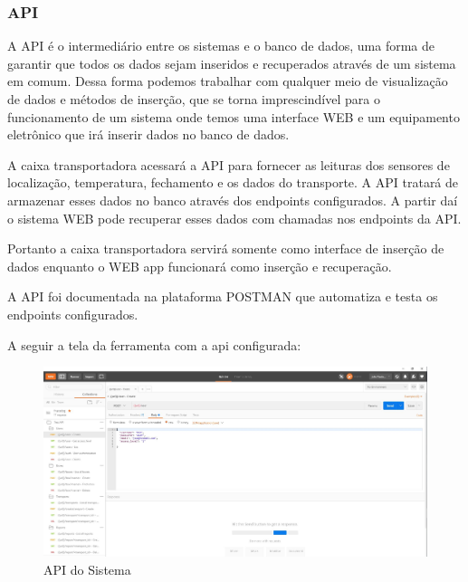 \subsubsection{API}

A API é o intermediário entre os sistemas e o banco de dados, uma forma de garantir que todos os dados sejam inseridos e recuperados através de um sistema em comum. Dessa forma podemos trabalhar com qualquer meio de visualização de dados e métodos de inserção, que se torna imprescindível para o funcionamento de um sistema onde temos uma interface WEB e um equipamento eletrônico que irá inserir dados no banco de dados.

A caixa transportadora acessará a API para fornecer as leituras dos sensores de localização, temperatura, fechamento e os dados do transporte. A API tratará de armazenar esses dados no banco através dos endpoints configurados. A partir daí o sistema WEB pode recuperar esses dados com chamadas nos endpoints da API. 

Portanto a caixa transportadora servirá somente como interface de inserção de dados enquanto o WEB app funcionará como inserção e recuperação.

A API foi documentada na plataforma POSTMAN que automatiza e testa os endpoints configurados. 

 A seguir a tela da ferramenta com a api configurada:

\begin{figure}[H]
\centering
\includegraphics[width=16cm]{figuras/api_software.JPG}
\caption{API do Sistema}
\end{figure}